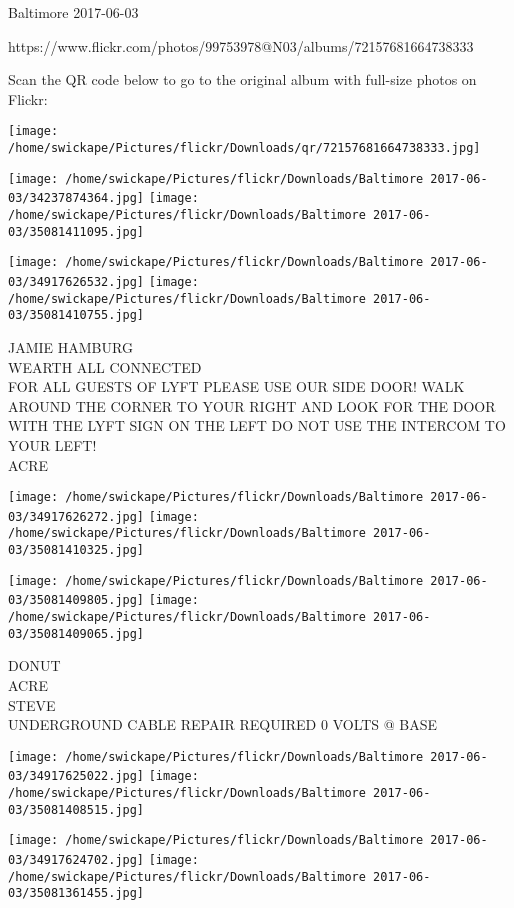 \documentclass[10pt,letterpaper]{article}
\begin{document}
Baltimore 2017-06-03

https://www.flickr.com/photos/99753978@N03/albums/72157681664738333

Scan the QR code below to go to the original album with full-size photos on Flickr:

\texttt{[image: /home/swickape/Pictures/flickr/Downloads/qr/72157681664738333.jpg]}
\pagebreak

\texttt{[image: /home/swickape/Pictures/flickr/Downloads/Baltimore 2017-06-03/34237874364.jpg]}
\texttt{[image: /home/swickape/Pictures/flickr/Downloads/Baltimore 2017-06-03/35081411095.jpg]}

\texttt{[image: /home/swickape/Pictures/flickr/Downloads/Baltimore 2017-06-03/34917626532.jpg]}
\texttt{[image: /home/swickape/Pictures/flickr/Downloads/Baltimore 2017-06-03/35081410755.jpg]}

JAMIE HAMBURG\\
WEARTH ALL CONNECTED\\
FOR ALL GUESTS OF LYFT PLEASE USE OUR SIDE DOOR!  WALK AROUND THE CORNER TO YOUR RIGHT AND LOOK FOR THE DOOR WITH THE LYFT SIGN ON THE LEFT DO NOT USE THE INTERCOM TO YOUR LEFT!\\
ACRE
\pagebreak

\texttt{[image: /home/swickape/Pictures/flickr/Downloads/Baltimore 2017-06-03/34917626272.jpg]}
\texttt{[image: /home/swickape/Pictures/flickr/Downloads/Baltimore 2017-06-03/35081410325.jpg]}

\texttt{[image: /home/swickape/Pictures/flickr/Downloads/Baltimore 2017-06-03/35081409805.jpg]}
\texttt{[image: /home/swickape/Pictures/flickr/Downloads/Baltimore 2017-06-03/35081409065.jpg]}

DONUT\\
ACRE\\
STEVE\\
UNDERGROUND CABLE REPAIR REQUIRED 0 VOLTS @ BASE
\pagebreak

\texttt{[image: /home/swickape/Pictures/flickr/Downloads/Baltimore 2017-06-03/34917625022.jpg]}
\texttt{[image: /home/swickape/Pictures/flickr/Downloads/Baltimore 2017-06-03/35081408515.jpg]}

\texttt{[image: /home/swickape/Pictures/flickr/Downloads/Baltimore 2017-06-03/34917624702.jpg]}
\texttt{[image: /home/swickape/Pictures/flickr/Downloads/Baltimore 2017-06-03/35081361455.jpg]}
\end{document}
